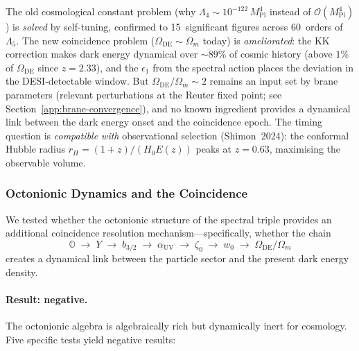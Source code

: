 \noindent
The old cosmological constant problem (why $\Lambda_4 \sim 10^{-122}\,M_{\mathrm{Pl}}^4$ instead of $\mathcal{O}(M_{\mathrm{Pl}}^4)$) is \emph{solved} by self-tuning, confirmed to 15~significant figures across 60~orders of $\Lambda_5$. The new coincidence problem ($\Omega_{\mathrm{DE}} \sim \Omega_m$ today) is \emph{ameliorated}: the KK correction makes dark energy dynamical over ${\sim}89\%$ of cosmic history (above $1\%$ of $\Omega_{\mathrm{DE}}$ since $z = 2.33$), and the $\epsilon_1$ from the spectral action places the deviation in the DESI-detectable window. But $\Omega_{\mathrm{DE}}/\Omega_m \sim 2$ remains an input set by brane parameters (relevant perturbations at the Reuter fixed point; see Section~\ref{app:brane-convergence}), and no known ingredient provides a dynamical link between the dark energy onset and the coincidence epoch. The timing question is \emph{compatible with} observational selection (Shimon~2024): the conformal Hubble radius $r_H = (1+z)/(H_0 E(z))$ peaks at $z = 0.63$, maximising the observable volume.

\subsubsection{Octonionic Dynamics and the Coincidence}

We tested whether the octonionic structure of the spectral triple provides an additional coincidence resolution mechanism---specifically, whether the chain
\[
  \mathbb{O} \;\to\; Y \;\to\; b_{3/2} \;\to\; \alpha_{\mathrm{UV}} \;\to\; \zeta_0 \;\to\; w_0 \;\to\; \Omega_{\mathrm{DE}}/\Omega_m
\]
creates a dynamical link between the particle sector and the present dark energy density.

\paragraph{Result: negative.} The octonionic algebra is algebraically rich but dynamically inert for cosmology. Five specific tests yield negative results:

